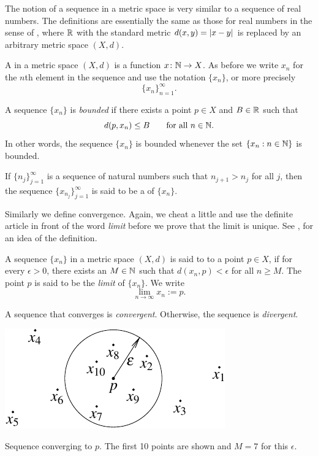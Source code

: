 The notion of a sequence in a metric space is very similar to a sequence of
real numbers.
The definitions are essentially the same as those for real numbers
in the sense of , where ${\mathbb{R}}$ with
the standard metric $d(x,y)=\left\lvert {x-y} \right\rvert$ is replaced
by an arbitrary metric space $(X,d)$.


\begin{defn}
A \emph{} in a metric space $(X,d)$ is a function
$x \colon {\mathbb{N}} \to X$.  As before we write $x_n$ for the $n$th element in
the sequence and use the notation $\{ x_n \}$, or more precisely
\begin{equation*}
\{ x_n \}_{n=1}^\infty .
\end{equation*}

A sequence $\{ x_n \}$ is \emph{bounded} if
there exists a point $p \in X$ and $B \in {\mathbb{R}}$ such that
\begin{equation*}
d(p,x_n) \leq B \qquad \text{for all $n \in {\mathbb{N}}$.}
\end{equation*}
In other words, the sequence $\{x_n\}$ is bounded whenever
the set $\{ x_n : n \in {\mathbb{N}} \}$
is bounded.

If $\{ n_j \}_{j=1}^\infty$ is a sequence of natural numbers
such that $n_{j+1} > n_j$ for all $j$, then
the sequence $\{ x_{n_j} \}_{j=1}^\infty$ is said to be
a \emph{} of $\{x_n \}$.
\end{defn}

Similarly we define convergence.  Again, we cheat a little
and use the definite article in front of the word \emph{limit}
before we prove that the limit is unique.
See , for an idea of
the definition.

\begin{defn}
A sequence $\{ x_n \}$ in a metric space $(X,d)$ is said
to \emph{} to a point
$p \in X$, if for every $\epsilon > 0$, there exists an $M \in {\mathbb{N}}$ such
that $d(x_n,p) < \epsilon$ for all $n \geq M$.  The point $p$
is said to be the \emph{limit}
of $\{ x_n \}$.  We write
\begin{equation*}
\lim_{n\to \infty} x_n := p .
\end{equation*}

A sequence
that converges is \emph{convergent}.
Otherwise, the sequence is 
\emph{divergent}.
\begin{myfigureht}
\includegraphics{figures/sequence-convergence-metric}
\caption{Sequence converging to $p$.  The first 10 points 
are shown and $M=7$ for this $\epsilon$.\label{fig:sequence-convergence-metric}}
\end{myfigureht}
\end{defn}

